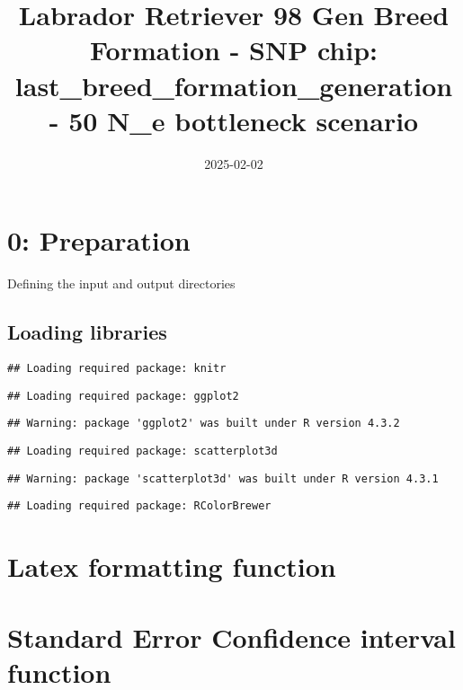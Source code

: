 \documentclass[
]{article}
\title{Labrador Retriever 98 Gen Breed Formation - SNP chip:
last\_breed\_formation\_generation - 50 N\_e bottleneck scenario}
\author{}
\date{\vspace{-2.5em}2025-02-02}
\begin{document}
\maketitle

{
\setcounter{tocdepth}{2}
\tableofcontents
}
\section{0: Preparation}\label{preparation}

Defining the input and output directories

\subsection{Loading libraries}\label{loading-libraries}

\begin{verbatim}
## Loading required package: knitr
\end{verbatim}

\begin{verbatim}
## Loading required package: ggplot2
\end{verbatim}

\begin{verbatim}
## Warning: package 'ggplot2' was built under R version 4.3.2
\end{verbatim}

\begin{verbatim}
## Loading required package: scatterplot3d
\end{verbatim}

\begin{verbatim}
## Warning: package 'scatterplot3d' was built under R version 4.3.1
\end{verbatim}

\begin{verbatim}
## Loading required package: RColorBrewer
\end{verbatim}

\section{Latex formatting function}\label{latex-formatting-function}

\section{Standard Error Confidence interval
function}\label{standard-error-confidence-interval-function}
\end{document}
